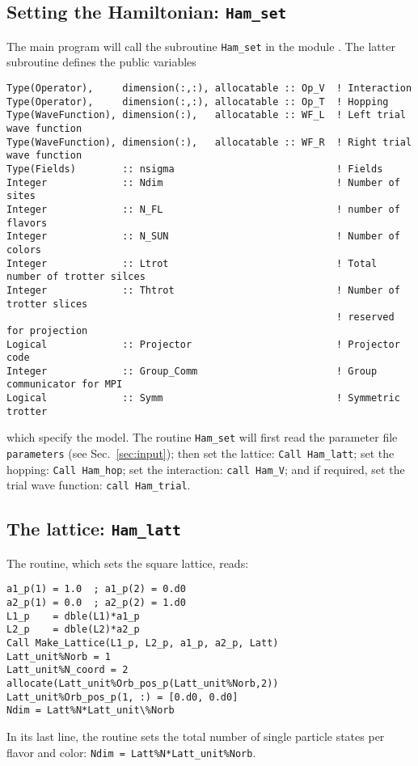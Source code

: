 \subsection{Setting the Hamiltonian:  \texttt{Ham\_set} }

The main program will call the subroutine \texttt{Ham\_set} in the module .
The latter  subroutine  defines the  public variables
\begin{lstlisting}[style=fortran]
Type(Operator),     dimension(:,:), allocatable :: Op_V  ! Interaction
Type(Operator),     dimension(:,:), allocatable :: Op_T  ! Hopping
Type(WaveFunction), dimension(:),   allocatable :: WF_L  ! Left trial wave function
Type(WaveFunction), dimension(:),   allocatable :: WF_R  ! Right trial wave function
Type(Fields)        :: nsigma                            ! Fields
Integer             :: Ndim                              ! Number of sites
Integer             :: N_FL                              ! number of flavors
Integer             :: N_SUN	                         ! Number of colors 
Integer             :: Ltrot                             ! Total number of trotter silces
Integer             :: Thtrot                            ! Number of trotter slices 
                                                         ! reserved for projection
Logical             :: Projector                         ! Projector code
Integer             :: Group_Comm                        ! Group communicator for MPI
Logical             :: Symm                              ! Symmetric trotter 
\end{lstlisting}
which specify the model.  The  routine \texttt{Ham\_set}  will first  read the parameter file \texttt{parameters} (see Sec.~\ref{sec:input}); then set the lattice: \texttt{Call Ham\_latt};  set the hopping: \texttt{Call Ham\_hop};  
 set the interaction: \texttt{call Ham\_V}; and if required, set the trial wave function: \texttt{call Ham\_trial}.

\subsection{The lattice: \texttt{Ham\_latt}} \label{U_PV_Ham_latt}

The routine, which sets the square lattice, reads:
\begin{lstlisting}[style=fortran]
a1_p(1) = 1.0  ; a1_p(2) = 0.d0
a2_p(1) = 0.0  ; a2_p(2) = 1.d0
L1_p    = dble(L1)*a1_p
L2_p    = dble(L2)*a2_p
Call Make_Lattice(L1_p, L2_p, a1_p, a2_p, Latt)
Latt_unit%Norb = 1
Latt_unit%N_coord = 2
allocate(Latt_unit%Orb_pos_p(Latt_unit%Norb,2))
Latt_unit%Orb_pos_p(1, :) = [0.d0, 0.d0]
Ndim = Latt%N*Latt_unit\%Norb

\end{lstlisting}
In its last line, the routine sets the total number of single particle states per flavor and color:
\texttt{Ndim = Latt\%N*Latt\_unit\%Norb}.

